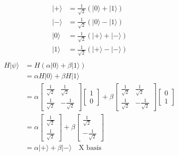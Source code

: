 \documentclass{article}
\begin{document}
\begin{align*}
	|+\rangle & = \frac{1}{\sqrt{2}}(|0\rangle + |1\rangle) \\
	|-\rangle & = \frac{1}{\sqrt{2}}(|0\rangle - |1\rangle) \\
	|0\rangle & = \frac{1}{\sqrt{2}}(|+\rangle + |-\rangle) \\
	|1\rangle & = \frac{1}{\sqrt{2}}(|+\rangle - |-\rangle) \\
\end{align*}
\begin{align}
	\label{eq:2}
	H |\psi\rangle & = H(\alpha |0\rangle + \beta |1\rangle)                                         \\
	               & = \alpha H|0\rangle + \beta H|1\rangle                                          \\
	               & = \alpha \begin{bmatrix}
		                          \frac{1}{\sqrt{2}} & \frac{1}{\sqrt{2}}  \\
		                          \frac{1}{\sqrt{2}} & -\frac{1}{\sqrt{2}}
	                          \end{bmatrix}
	\begin{bmatrix}
		1 \\
		0
	\end{bmatrix}
	+ \beta \begin{bmatrix}
		        \frac{1}{\sqrt{2}} & \frac{1}{\sqrt{2}}  \\
		        \frac{1}{\sqrt{2}} & -\frac{1}{\sqrt{2}}
	        \end{bmatrix}
	\begin{bmatrix}
		0 \\
		1
	\end{bmatrix}                                                                                   \\
	               & = \alpha \begin{bmatrix}
		                          \frac{1}{\sqrt{2}} \\
		                          \frac{1}{\sqrt{2}}
	                          \end{bmatrix}
	+
	\beta \begin{bmatrix}
		      \frac{1}{\sqrt{2}} \\
		      -\frac{1}{\sqrt{2}}
	      \end{bmatrix}                                                          \\
	               & = \alpha |+\rangle + \beta |-\rangle \quad \text{X basis}
\end{align}
\end{document}
